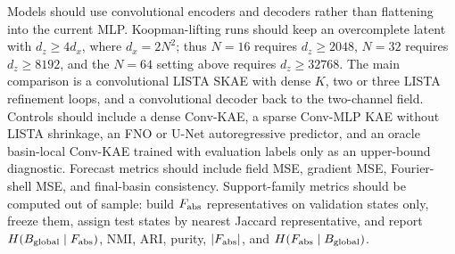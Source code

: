 Models should use convolutional encoders and decoders rather than flattening into the current MLP. Koopman-lifting runs should keep an overcomplete latent with \(d_z\ge4d_x\), where \(d_x=2N^2\); thus \(N=16\) requires \(d_z\ge2048\), \(N=32\) requires \(d_z\ge8192\), and the \(N=64\) setting above requires \(d_z\ge32768\). The main comparison is a convolutional LISTA SKAE with dense \(K\), two or three LISTA refinement loops, and a convolutional decoder back to the two-channel field. Controls should include a dense Conv-KAE, a sparse Conv-MLP KAE without LISTA shrinkage, an FNO or U-Net autoregressive predictor, and an oracle basin-local Conv-KAE trained with evaluation labels only as an upper-bound diagnostic. Forecast metrics should include field MSE, gradient MSE, Fourier-shell MSE, and final-basin consistency. Support-family metrics should be computed out of sample: build \(F_{\rm abs}\) representatives on validation states only, freeze them, assign test states by nearest Jaccard representative, and report \(H(B_{\rm global}\mid F_{\rm abs})\), NMI, ARI, purity, \(|F_{\rm abs}|\), and \(H(F_{\rm abs}\mid B_{\rm global})\).

